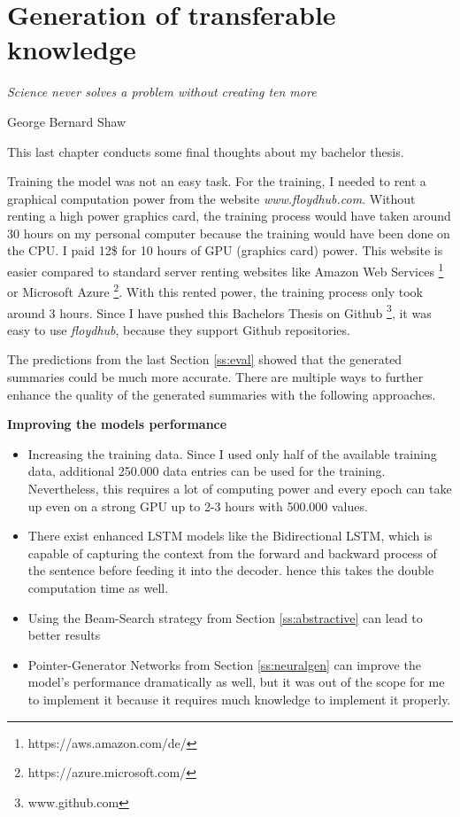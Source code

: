 \chapter{Generation of transferable knowledge}\label{ch:knowledge}

\epigraph{\textit{Science never solves a problem without creating ten more}}{George Bernard Shaw}

This last chapter conducts some final thoughts about my bachelor thesis.

Training the model was not an easy task. For the training, I needed to rent a graphical computation power from the website \textit{www.floydhub.com}. Without renting a high power graphics card, the training process would have taken around 30 hours on my personal computer because the training would have been done on the CPU. I paid 12\$ for 10 hours of GPU (graphics card) power. This website is easier compared to standard server renting websites like Amazon Web Services \footnote{https://aws.amazon.com/de/} or Microsoft Azure \footnote{https://azure.microsoft.com/}. With this rented power, the training process only took around 3 hours. Since I have pushed this Bachelors Thesis on Github \footnote{www.github.com}, it was easy to use \textit{floydhub}, because they support Github repositories.

The predictions from the last Section \ref{ss:eval} showed that the generated summaries could be much more accurate. There are multiple ways to further enhance the quality of the generated summaries with the following approaches. 

\textbf{Improving the models performance} 

\begin{itemize}
	\item Increasing the training data. Since I used only half of the available training data, additional 250.000 data entries can be used for the training. Nevertheless, this requires a lot of computing power and every epoch can take up even on a strong GPU up to 2-3 hours with 500.000 values.
	\item There exist enhanced LSTM models like the Bidirectional LSTM, which is capable of capturing the context from the forward and backward process of the sentence before feeding it into the decoder. hence this takes the double computation time as well.
	\item Using the Beam-Search strategy from Section \ref{ss:abstractive} can lead to better results
	\item Pointer-Generator Networks from Section \ref{ss:neuralgen} can improve the model's performance dramatically as well, but it was out of the scope for me to implement it because it requires much knowledge to implement it properly.
\end{itemize}


